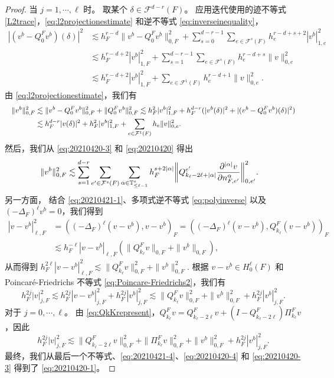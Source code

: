 \begin{proof}
当 $j=1,\cdots, \ell$ 时。
取某个 $\delta\in\mathcal F^{d-r}(F)$。
应用迭代使用的迹不等式 \eqref{L2trace}，\eqref{eq:l2projectionestimate} 和逆不等式 \eqref{eq:inverseinequality}，
\begin{align*}
|(v^b-Q_0^Fv^b)(\delta)|^2&\lesssim h_F^{r-d}\|v^b-Q_0^Fv^b\|_{0,F}^2+\sum_{s=0}^{d-r-1}\sum_{e\in\mathcal F^{s}(F)}h_e^{r-d+s+2}|v^b|_{1,e}^2 \\
&\lesssim h_F^{r-d+2}|v^b|_{1,F}^2+ \sum_{s=1}^{d-r-1}\sum_{e\in\mathcal F^{s}(F)}h_e^{r-d+s}\|v\|_{0,e}^2 \\
&\lesssim h_F^{r-d+2}|v^b|_{1,F}^2+ \sum_{e\in\mathcal F^{1}(F)}h_e^{r-d+1}\|v\|_{0,e}^2.
\end{align*}
由 \eqref{eq:l2projectionestimate}，我们有
$$
\resizebox{\textwidth}{!}{$\displaystyle
\begin{aligned}
\|v^b\|_{0,F}^2&\lesssim \|v^b-Q_0^Fv^b\|_{0,F}^2+\|Q_0^Fv^b\|_{0,F}^2 \lesssim h_F^2|v^b|_{1,F}^2 + h_F^{d-r}(|v^b(\delta)|^2+|(v^b-Q_0^Fv^b)(\delta)|^2) \\
& \lesssim h_F^{d-r}|v(\delta)|^2+h_F^{2}|v^b|_{1,F}^2+\sum_{e\in\mathcal F^{1}(F)}h_e\|v\|_{0,e}^2.
\end{aligned}
$}
$$
然后，我们从 \eqref{eq:20210420-3} 和 \eqref{eq:20210420} 得出
\begin{align}
\|v^b\|_{0,F}^2&\lesssim \sum_{s=1}^{d-r}\sum_{e'\in\mathcal
F^{s}(F)}\sum_{\alpha\in \mathbb{T}^{s}_{\leq \ell-1}}h_F^{s+2|\alpha|}\bigg\|Q_{k_{\ell}-2\ell+|\alpha|}^{e'}\frac{\partial^{|\alpha|}v}{\partial n_{F,e'}^{\alpha}}\bigg\|_{0,e'}^2.  \label{eq:20210420-4}
\end{align}
另一方面，
结合 \eqref{eq:20210421-1}、多项式逆不等式 \eqref{eq:polyinverse} 以及 $(-\Delta_F)^{\ell}v^b=0$，我们得到
\begin{align*}
|v-v^b|_{\ell,F}^2&=((-\Delta_F)^{\ell}(v-v^b), v-v^b)_F=((-\Delta_F)^{\ell}(v-v^b), Q_{k_{\ell}}^F(v-v^b))_F \\
&\lesssim h_F^{-\ell}|v-v^b|_{\ell,F}(\|Q_{k_{\ell}}^Fv\|_{0,F} + \|v^b\|_{0,F}), 
\end{align*}
从而得到
$
h_F^{2\ell}|v-v^b|_{\ell,F}^2\lesssim \|Q_{k_{\ell}}^Fv\|_{0,F}^2 + \|v^b\|_{0,F}^2.
$
根据 $v-v^b\in H_0^{\ell}(F)$ 和 Poincar\'e-Friedrichs 不等式 \eqref{eq:Poincare-Friedrichs2}，我们有
$$
h_F^{2j}|v|_{j,F}^2\lesssim
h_F^{2j}|v-v^b|_{j,F}^2+h_F^{2j}|v^b|_{j,F}^2\lesssim
\|Q_{k_{\ell}}^Fv\|_{0,F}^2 + \|v^b\|_{0,F}^2+h_F^{2j}|v^b|_{j,F}^2.
$$
对于 $j=0,\cdots, \ell$。
由 \eqref{eq:QkKrepresent}，$Q_{k_{\ell}}^Fv=Q_{k_{\ell}-2\ell}^Fv+(I-Q_{k_{\ell}-2\ell}^F)\Pi_{k_{\ell}}^Fv$，因此
$$
h_F^{2j}|v|_{j,F}^2\lesssim \|Q_{k_{\ell}-2\ell}^Fv\|_{0,F}^2 + \|\Pi_{k_{\ell}}^Fv\|_{0,F}^2 + \|v^b\|_{0,F}^2+h_F^{2j}|v^b|_{j,F}^2.
$$
最终，我们从最后一个不等式、\eqref{eq:20210421-4}、\eqref{eq:20210420-4} 和 \eqref{eq:20210420-3} 得到了 \eqref{eq:20210420-1}。
\end{proof}

